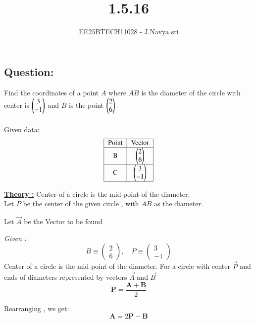 \documentclass[journal]{IEEEtran}
\numberwithin{equation}{enumi}
\numberwithin{figure}{enumi}
\begin{document}

\vspace{3cm}

\title{1.5.16}
\author{EE25BTECH11028 - J.Navya sri}
\maketitle

\subsection*{\textbf{Question:} } 
Find the coordinates of a point $A$ where $AB$ is the diameter of the circle with center is $\begin{pmatrix}3\\-1 \end{pmatrix}$ and $B$ is the point $\begin{pmatrix}2\\6\end{pmatrix}.$\\
\solution \\ 
Given data:
\[
\begin{tabular}[12pt]{ |c| c| c|} 
    \hline
    {Point} & {Vector} \\ 
    \hline
    B & $ \myvec{2 \\ 6} $  \\
    \hline
    C & $ \myvec{3 \\ -1} $   \\
    \hline  
    \end{tabular}
\]

\underline{\textbf{Theory :}} Center of a circle is the mid-point of the diameter. \\

Let $P$ be the center of the given circle , with $AB$ as the diameter.

Let $\vec{A}$ be the Vector to be found 

\textit{Given :} 
\[
B \equiv \begin{pmatrix} 2 \\ 6 \end{pmatrix}, \quad P \equiv \begin{pmatrix} 3 \\ -1 \end{pmatrix}
\]
Center of a circle is the mid point of the diameter. For a circle with center $\vec{P}$ and ends of diameters represented by vectors $\vec{A}$ and $\vec{B}$  
\[
\mathbf{P} = \frac{\mathbf{A} + \mathbf{B}}{2} \tag{0.1}
\]

Rearranging , we get:
\[
\mathbf{A} = 2\mathbf{P} - \mathbf{B} \tag{0.2}
\]
\end{document}
